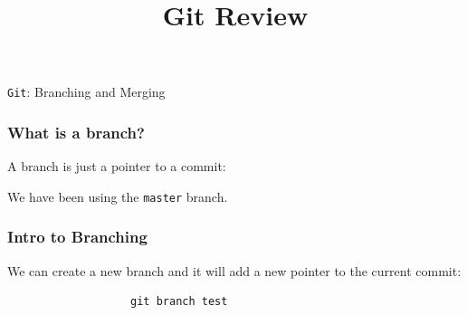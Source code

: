 \documentclass{beamer}
\title{Git Review}
\begin{document}
\begin{frame}
\begin{center}
 \texttt{Git}: Branching and Merging
\end{center}
\end{frame}

\begin{frame}
\frametitle{What is a branch?}
A branch is just a pointer to a commit:
\begin{center}

\vspace{20pt}
We have been using the \texttt{master} branch.
\end{center}

\end{frame}

\begin{frame}[fragile]
\frametitle{Intro to Branching}
We can create a new branch and it will add a new pointer to the current commit:
\begin{center}

\begin{verbatim}
                   git branch test
\end{verbatim}
\end{center}
\end{frame}
\end{document}
